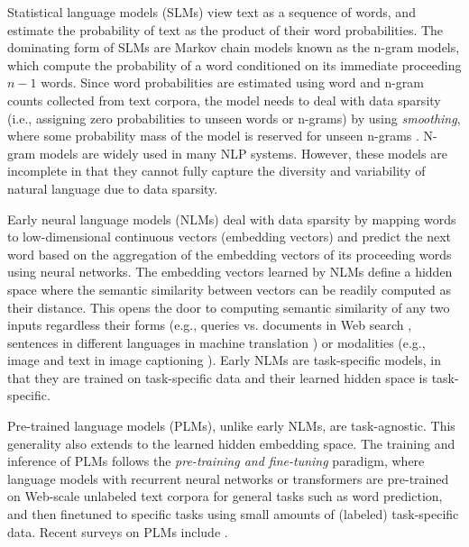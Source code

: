 \documentclass[conference]{IEEEtran}
\begin{document}
Statistical language models (SLMs) view text as a sequence of words, and estimate the probability of text as the product of their word probabilities. The dominating form of SLMs are Markov chain models known as the n-gram models, which compute the probability of a word conditioned on its immediate proceeding $n-1$ words. Since word probabilities are estimated using word and n-gram counts collected from text corpora, the model needs to deal with data sparsity (i.e., assigning zero probabilities to unseen words or n-grams) by using \emph{smoothing}, where some probability mass of the model is reserved for unseen n-grams \cite{chen1999empirical}. N-gram models are widely used in many NLP systems. However, these models are incomplete in that they cannot fully capture the diversity and variability of natural language due to data sparsity.  

Early neural language models (NLMs) \cite{bengio2000neural,schwenk2006continuous,mikolov2010recurrent,graves2013generating} deal with data sparsity by mapping words to low-dimensional continuous vectors (embedding vectors) and predict the next word based on the aggregation of the embedding vectors of its proceeding words using neural networks. The embedding vectors learned by NLMs define a hidden space where the semantic similarity between vectors can be readily computed as their distance. 
This opens the door to computing semantic similarity of any two inputs regardless their forms (e.g., queries vs. documents in Web search \cite{huang2013learning, gao2023neural}, sentences in different languages in machine translation \cite{sutskever2014sequence, cho2014properties}) or modalities (e.g., image and text in image captioning \cite{fang2015captions, vinyals2015show}). Early NLMs are task-specific models, in that they are trained on task-specific data and their learned hidden space is task-specific.



Pre-trained language models (PLMs), unlike early NLMs, are task-agnostic. This generality also extends to the learned hidden embedding space. The training and inference of PLMs follows the \emph{pre-training and fine-tuning} paradigm, where language models with recurrent neural networks \cite{peters2018deep} or transformers \cite{devlin2018bert,liu2019roberta,he2020deberta} are pre-trained on Web-scale unlabeled text corpora for general tasks such as word prediction, and then finetuned to specific tasks using small amounts of (labeled) task-specific data. Recent surveys on PLMs include \cite{zhou2023comprehensive, han2021pre,qiu2020pre}. 
\end{document}
